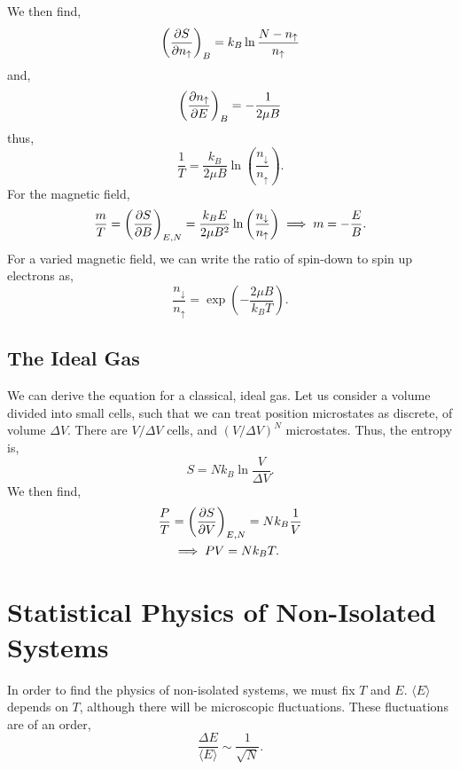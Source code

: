 \documentclass{book}
\begin{document}
We then find,
\begin{equation}
	\left(\pdv{S}{n_{\uparrow}}\right)_B = k_B \ln \frac{N - n_{\uparrow}}{n_{\uparrow}}
\end{equation}
and,
\begin{equation}
	\left(\pdv{n_{\uparrow}}{E}\right)_B = -\frac{1}{2\mu B}
\end{equation}
thus,
\begin{equation}
	\frac{1}{T} = \frac{k_B}{2\mu B}\ln \left(\frac{n_{\downarrow}}{n_{\uparrow}}\right).
\end{equation}
For the magnetic field,
\begin{equation}
	\frac{m}{T} = \left(\pdv{S}{B}\right)_{E,N} = \frac{k_BE}{2\mu B^2}\ln \left(\frac{n_{\downarrow}}{n_{\uparrow}}\right) \implies m = -\frac{E}{B}.
\end{equation}
For a varied magnetic field, we can write the ratio of spin-down to spin up electrons as,
\begin{equation}
	\frac{n_{\downarrow}}{n_{\uparrow}} = \exp\left(-\dfrac{2\mu B}{k_B T}\right). \label{eq:ratio}
\end{equation}
\section{The Ideal Gas}
We can derive the equation for a classical, ideal gas. Let us consider a volume divided into small cells, such that we can treat position microstates as discrete, of volume $\Delta V$. There are $V/\Delta V$ cells, and $\left(V/\Delta V\right)^N$ microstates. Thus, the entropy is,
\begin{equation}
	S = N k_B \ln\frac{V}{\Delta V}.
\end{equation}
We then find,
\begin{equation}
	\begin{split}
		\frac{P}{T} & = \left(\pdv{S}{V}\right)_{E,N} = Nk_B\frac{1}{V} \\
		& \implies PV = Nk_BT.
	\end{split}
\end{equation}
\chapter{Statistical Physics of Non-Isolated Systems}
In order to find the physics of non-isolated systems, we must fix $T$ and $E$. $\langle E \rangle$ depends on $T$, although there will be microscopic fluctuations. These fluctuations are of an order,
\begin{equation}
	\frac{\Delta E}{\langle E \rangle} \sim \frac{1}{\sqrt{N}}.
\end{equation}
\end{document}
